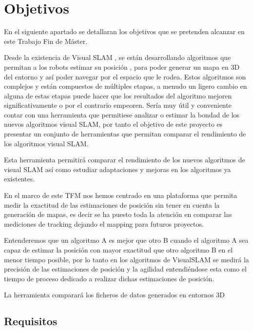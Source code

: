 \chapter{Objetivos} \label{cap:Objetivos}
\setcounter{page}{1}


En el siguiente apartado se detallaran los objetivos que se pretenden alcanzar en este Trabajo Fin de Máster.

Desde la existencia de Visual SLAM , se están desarrollando algoritmos que permitan a los robots estimar su posición , para poder generar un mapa en 3D del entorno y así poder navegar por el espacio que le rodea. Estos algoritmos son complejos y están compuestos de múltiples etapas, a menudo un ligero cambio en alguna de estas etapas puede hacer que los resultados del algoritmo mejoren significativamente o por el contrario empeoren. Sería muy útil y conveniente contar con una herramienta que permitiese analizar o estimar la bondad de los nuevos algoritmos visual SLAM, por tanto el objetivo de este proyecto es presentar un conjunto de herramientas que permitan comparar el rendimiento de los algoritmos visual SLAM.

Esta herramienta permitirá comparar el rendimiento de los nuevos algoritmos de visual SLAM así como estudiar adaptaciones y mejoras en los algoritmos ya existentes.

En el marco de este TFM nos hemos centrado en una plataforma que permita medir la exactitud de las estimaciones de posición sin tener en cuenta la generación de mapas, es decir se ha puesto toda la atención en comparar las mediciones de tracking dejando el mapping para futuros proyectos. 

Entenderemos que un algoritmo A es mejor que otro B cuando el algoritmo A sea capaz de estimar la posición con mayor exactitud que otro algoritmo B en el menor tiempo posible, por lo tanto en los algoritmos de VisualSLAM se medirá la precisión de las estimaciones de posición y la agilidad entendiéndose esta como el tiempo de proceso dedicado a realizar dichas estimaciones de posición. 

La herramienta comparará los ficheros de datos generados en entornos 3D

\section {Requisitos}

